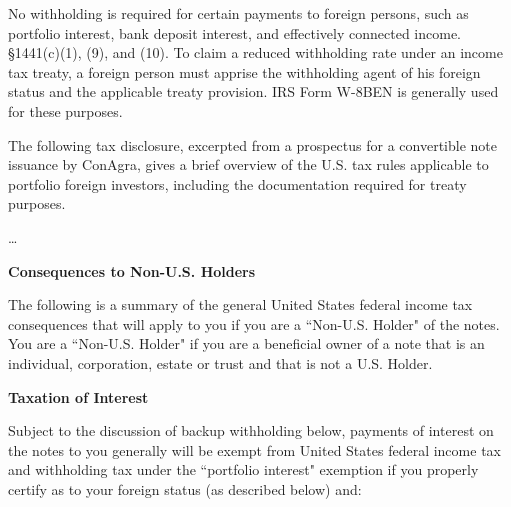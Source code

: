 No withholding is required for certain payments to foreign persons, such as portfolio interest, bank deposit interest, and effectively connected income.  \S 1441(c)(1), (9), and (10).  To claim a reduced withholding rate under an income tax treaty, a foreign person must apprise the withholding agent of his foreign status and the applicable treaty provision.  IRS Form W-8BEN is generally used for these purposes.      

The following tax disclosure, excerpted from a prospectus for a convertible note issuance by ConAgra, gives a brief overview of the U.S. tax rules applicable to portfolio foreign investors, including the documentation required for treaty purposes.


\begin{select}
\ldots
\begin{center}\textbf{Consequences to Non-U.S. Holders}
	\end{center}
The following is a summary of the general United States federal income tax consequences that will apply to you if you are a ``Non-U.S. Holder" of the notes. You are a ``Non-U.S. Holder" if you are a beneficial owner of a note that is an individual, corporation, estate or trust and that is not a U.S. Holder.

\begin{center}
	\textbf{Taxation of Interest}
	\end{center}
Subject to the discussion of backup withholding below, payments of interest on the notes to you generally will be exempt from United States federal income tax and withholding tax under the ``portfolio interest" exemption if you properly certify as to your foreign status (as described below) and:


\end{select}

